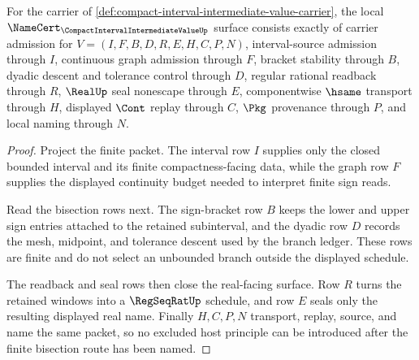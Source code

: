 \begin{theorem}
\label{thm:compact-interval-intermediate-value-namecert-obligations}
For the carrier of \autoref{def:compact-interval-intermediate-value-carrier}, the local $\NameCert_{\CompactIntervalIntermediateValueUp}$ surface consists exactly of carrier admission for $V=(I,F,B,D,R,E,H,C,P,N)$, interval-source admission through $I$, continuous graph admission through $F$, bracket stability through $B$, dyadic descent and tolerance control through $D$, regular rational readback through $R$, $\RealUp$ seal nonescape through $E$, componentwise $\hsame$ transport through $H$, displayed $\Cont$ replay through $C$, $\Pkg$ provenance through $P$, and local naming through $N$.
\end{theorem}
\begin{proof}
Project the finite packet. The interval row $I$ supplies only the closed bounded interval and its finite compactness-facing data, while the graph row $F$ supplies the displayed continuity budget needed to interpret finite sign reads.

Read the bisection rows next. The sign-bracket row $B$ keeps the lower and upper sign entries attached to the retained subinterval, and the dyadic row $D$ records the mesh, midpoint, and tolerance descent used by the branch ledger. These rows are finite and do not select an unbounded branch outside the displayed schedule.

The readback and seal rows then close the real-facing surface. Row $R$ turns the retained windows into a $\RegSeqRatUp$ schedule, and row $E$ seals only the resulting displayed real name. Finally $H,C,P,N$ transport, replay, source, and name the same packet, so no excluded host principle can be introduced after the finite bisection route has been named.
\end{proof}



